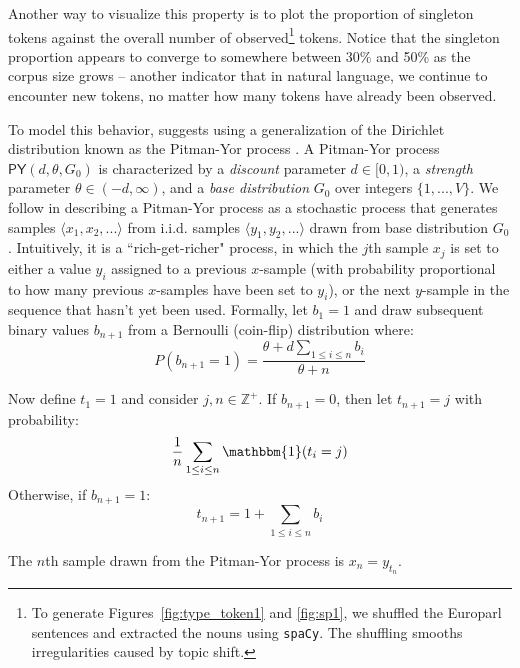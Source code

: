 \documentclass[11pt]{article}
\begin{document}
Another way to visualize this property \cite{teh-2006-hierarchical} is to plot the proportion of singleton tokens against the overall number of observed\footnote{To generate Figures~\ref{fig:type_token1} and \ref{fig:sp1}, we shuffled the Europarl sentences and extracted the nouns using \texttt{spaCy}. The shuffling smooths irregularities caused by topic shift.} tokens. Notice that the singleton proportion appears to converge to somewhere between 30\% and 50\% as the corpus size grows -- another indicator that in natural language, we continue to encounter new tokens, no matter how many tokens have already been observed.

To model this behavior, \cite{teh-2006-hierarchical} suggests using a generalization of the Dirichlet distribution \cite{kotz2004continuous} known as the Pitman-Yor process \cite{pitman1997two}. A Pitman-Yor process $\mathsf{PY}(d, \theta, G_0)$ is characterized by a \emph{discount} parameter $d \in [0,1)$, a \emph{strength} parameter $\theta \in (-d,\infty)$, and a \emph{base distribution} $G_0$ over integers $\{1, ..., V\}$. We follow \cite{teh-2006-hierarchical} in describing a Pitman-Yor process as a stochastic process that generates samples $\langle x_1, x_2, ... \rangle$ from i.i.d. samples $\langle y_1, y_2, ... \rangle$ drawn from base distribution $G_0$. Intuitively, it is a ``rich-get-richer" process, in which the $j$th sample $x_j$ is set to either a value $y_i$ assigned to a previous $x$-sample (with probability proportional to how many previous $x$-samples have been set to $y_i$), or the next $y$-sample in the sequence that hasn't yet been used. Formally, let $b_1=1$ and draw subsequent binary values $b_{n+1}$ from a Bernoulli (coin-flip) distribution where:
\begin{equation*}
	P(b_{n+1} = 1) =\frac{\theta + d\sum\limits_{1 \leq i \leq n} b_i}{\theta + n} 
\end{equation*}

\noindent Now define $t_1 = 1$ and consider $j, n \in \mathbb{Z}^+$. If $b_{n+1}=0$, then let $t_{n+1}=j$ with probability:
\begin{equation*}
	\frac{1}{n} \sum\limits_{1 \leq i \leq n} \mathbbm{1}(t_i=j)
\end{equation*}
Otherwise, if $b_{n+1}=1$: 
\begin{equation*}
t_{n+1}=1 + \sum\limits_{1 \leq i \leq n} b_i
\end{equation*}

\noindent The $n$th sample drawn from the Pitman-Yor process is $x_n = y_{t_n}$.
\end{document}
